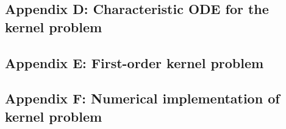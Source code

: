 \documentclass[]{article}
\begin{document}
\subsection{Appendix D: Characteristic ODE for the kernel
problem}\label{appendix-d-characteristic-ode-for-the-kernel-problem}

\subsection{Appendix E: First-order kernel
problem}\label{appendix-e-first-order-kernel-problem}

\subsection{Appendix F: Numerical implementation of kernel
problem}\label{appendix-f-numerical-implementation-of-kernel-problem}
\end{document}
